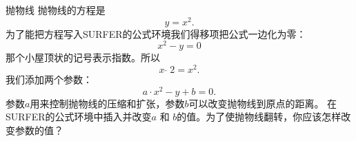 ﻿\begin{surferPage}[抛物线]{抛物线}
抛物线的方程是 \[y=x^2.\]
为了能把方程写入SURFER的公式环境我们得移项把公式一边化为零：
\[x^2-y=0\]
那个小屋顶状的记号表示指数。所以
\[ x  \,\hat{\ } \, 2 =x^2.\]
我们添加两个参数：
\[a \cdot x^2-y+b=0.\]
参数$a$用来控制抛物线的压缩和扩张，参数$b$可以改变抛物线到原点的距离。
\newline
在SURFER的公式环境中插入并改变$a$ 和 $b$的值。为了使抛物线翻转，你应该怎样改变参数的值？
\end{surferPage}


